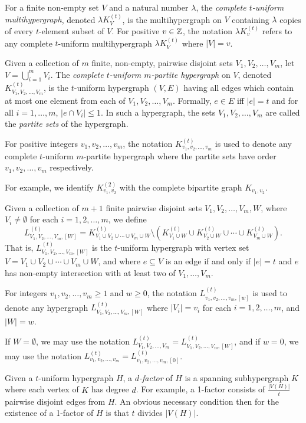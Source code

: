 For a finite non-empty set $V$ and a natural number $\lambda$, the {\em complete
$t$-uniform multihypergraph}, denoted $\lambda K_{V}^{(t)}$, is the
multihypergraph on $V$ containing $\lambda$ copies of every $t$-element subset
of $V$. For positive $v \in \mathbb{Z}$, the notation $\lambda K_{v}^{(t)}$ refers to
any complete $t$-uniform multihypergraph $\lambda K_{V}^{(t)}$ where $|V| = v$.

Given a collection of $m$ finite, non-empty, pairwise disjoint sets
$V_1, V_2, \ldots, V_m$, let $V = \bigcup_{i=1}^{m} V_i$.
The {\em complete $t$-uniform $m$-partite hypergraph} on $V$, denoted
$K_{V_1, V_2, \ldots, V_m}^{(t)}$, is the $t$-uniform hypergraph $(V, E)$ having
all edges which contain at most one element from each of $V_1, V_2, \ldots, V_m$.
Formally, $e \in E$ iff $|e| = t$ and for all $i=1,\ldots,m$, $|e \cap V_i| \leq 1$.
In such a hypergraph, the sets $V_1, V_2, \ldots, V_m$ are called the
{\em partite sets} of the hypergraph.

For positive integers $v_1, v_2, \ldots, v_m$, the notation $K_{v_1, v_2,
\ldots, v_m}^{(t)}$ is used to denote any complete $t$-uniform $m$-partite
hypergraph where the partite sets have order $v_1, v_2, \ldots, v_m$
respectively.

For example, we identify $K_{v_1, v_2}^{(2)}$ with the complete bipartite graph
$K_{v_1,v_2}$.

Given a collection of $m+1$ finite pairwise disjoint sets
$V_1, V_2, \ldots, V_m, W$, where $V_i \neq \emptyset$ for each $i = 1, 2, \ldots, m$, we define
\[
    L_{V_1, V_2, \ldots, V_m, [W]}^{(t)} = K_{V_1 \cup V_2 \cup \cdots \cup V_m \cup W}^{(t)} \setminus (K_{V_1 \cup W}^{(t)} \cup K_{V_2 \cup W}^{(t)} \cup \cdots \cup K_{V_m \cup W}^{(t)}).
\]
That is, $L_{V_1, V_2, \ldots, V_m, [W]}^{(t)}$ is the $t$-uniform hypergraph with vertex set $V = V_1 \cup V_2 \cup \cdots \cup V_m \cup W$, and where $e \subseteq V$ is an edge if and only if $|e| = t$ and $e$ has non-empty intersection with at least two of $V_1, \ldots, V_m$.

For integers $v_1, v_2, \ldots, v_m \geq 1$ and $w \geq 0$, the notation $L_{v_1, v_2, \ldots, v_m, [w]}^{(t)}$ is used to denote any hypergraph $L_{V_1, V_2, \ldots, V_m, [W]}^{(t)}$ where $|V_i| = v_i$ for each $i = 1, 2, \ldots, m$, and $|W| = w$.

If $W = \emptyset$, we may use the notation $L_{V_1, V_2, \ldots, V_m}^{(t)} = L_{V_1, V_2, \ldots, V_m, [W]}^{(t)}$, and if $w = 0$, we may use the notation $L_{v_1, v_2, \ldots, v_m}^{(t)} = L_{v_1, v_2, \ldots, v_m, [0]}^{(t)}$.


Given a $t$-uniform hypergraph $H$, a {\em $d$-factor} of $H$ is a spanning
subhypergraph $K$ where each vertex of $K$ has degree $d$. For example, a
1-factor consists of $\frac{|V(H)|}{t}$ pairwise disjoint edges from $H$. An
obvious necessary condition then for the existence of a 1-factor of $H$ is that
$t$ divides $|V(H)|$.
